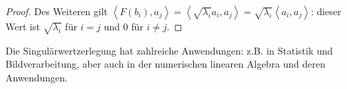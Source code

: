 \documentclass[
a4paper,12pt,
bibliography=totocnumbered,
numbers=noenddot,
]{scrartcl}
\numberwithin{equation}{subsection}
\newcommand{\scalar}[1]{\left\langle #1 \right\rangle}
\theoremstyle{plain}
\theoremstyle{definition}
\begin{document}
\begin{proof}
 	Des Weiteren gilt $\scalar{ F(b_i) , a_j}  = \scalar{ \sqrt{\lambda_i} a_i, a_j} = \sqrt{\lambda_i} \scalar{ a_i, a_j}$: dieser Wert ist $\sqrt{\lambda_i}$ für $i=j$ und $0$ für $i \ne j$. 
\end{proof} 


Die Singulärwertzerlegung hat zahlreiche Anwendungen: z.B. in Statistik und Bildverarbeitung, aber auch in der numerischen linearen Algebra und deren Anwendungen. 
\end{document}
